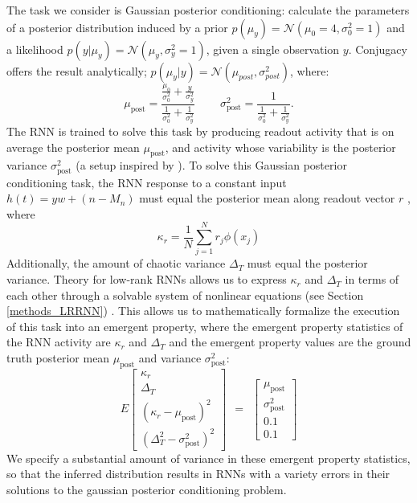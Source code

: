 \documentclass[11pt]{article}
\begin{document}
The task we consider is Gaussian posterior conditioning: calculate the parameters of a posterior distribution induced by a prior $p(\mu_y) = \mathcal{N}(\mu_0=4, \sigma_0^2=1)$ and a likelihood $p(y | \mu_y) = \mathcal{N}(\mu_y,\sigma^2_y = 1)$, given a single observation $y$.  Conjugacy offers the result analytically; $p(\mu_y | y ) = \mathcal{N}\left(\mu_{post},\sigma_{post}^2\right)$, where:   
\begin{equation}
\mu_{\text{post}} = \frac{\frac{\mu_0}{\sigma_0^2} + \frac{y}{\sigma_y^2}}{\frac{1}{\sigma_0^2} + \frac{1}{\sigma_y^2}}
~~~~~~~~~~
 \sigma^2_{\text{post}} = \frac{1}{\frac{1}{\sigma_0^2} + \frac{1}{\sigma_y^2}}.
\end{equation} 
The RNN is trained to solve this task by producing readout activity that is on average the posterior mean $\mu_{\text{post}}$, and activity whose variability is the posterior variance $\sigma^2_{\text{post}}$ (a setup inspired by \cite{echeveste2019cortical}). 
To solve this Gaussian posterior conditioning task, the RNN response to a constant input $h(t) = y w + (n-M_n)$ must equal the posterior mean along readout vector $r$ , where
\begin{equation}
\kappa_r =  \frac{1}{N} \sum_{j=1}^N r_j \phi(x_j)
\end{equation}
Additionally, the amount of chaotic variance $\Delta_T$ must equal the posterior variance.
Theory for low-rank RNNs allows us to express $\kappa_r$ and $\Delta_T$ in terms of each other through a solvable system of nonlinear equations  (see Section \ref{methods_LRRNN}) \cite{mastrogiuseppe2018linking}.
This allows us to mathematically formalize the execution of this task into an emergent property, where the emergent property statistics of the RNN activity are $\kappa_r$ and $\Delta_T$ and the emergent property values are the ground truth posterior mean $\mu_{\text{post}}$ and variance $\sigma^2_{\text{post}}$:
\begin{equation}
E \begin{bmatrix} \kappa_r \\ \Delta_T \\ (\kappa_r-\mu_{\text{post}})^2 \\ (\Delta_T^2-\sigma^2_{\text{post}})^2 \end{bmatrix} ~~=~~ \begin{bmatrix} \mu_{\text{post}} \\ \sigma^2_{\text{post}} \\ 0.1 \\ 0.1 \end{bmatrix}
\end{equation}
We specify a substantial amount of variance in these emergent property statistics, so that the inferred distribution results in RNNs with a variety errors in their solutions to the gaussian posterior conditioning problem. 
\end{document}
